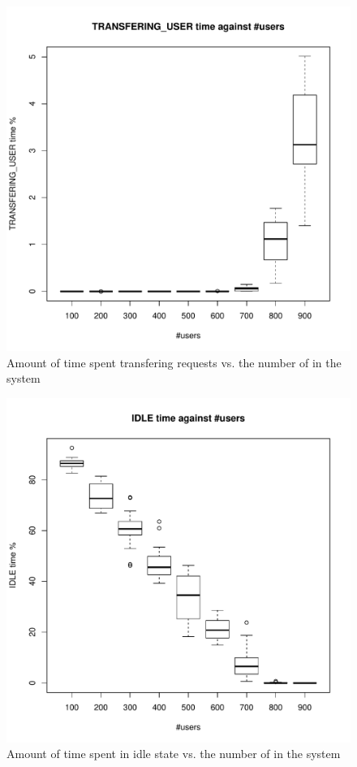 \begin{figure}[tb]
	\centering
	\includegraphics[width=\linewidth]{TRANSFERING_USER.pdf} 
	\caption{Amount of time spent transfering requests vs. the number of \ues in the system}
	\label{fig:transfering}
\end{figure}

\begin{figure}[tb]
	\centering
	\includegraphics[width=\linewidth]{IDLE.pdf} 
	\caption{Amount of time spent in idle state vs. the number of \ues in the system}
	\label{fig:idle}
\end{figure}

